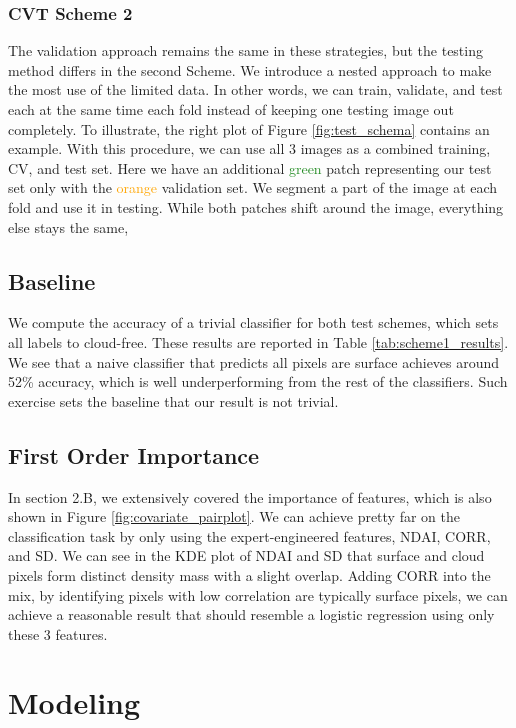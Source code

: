 \documentclass[11pt, letterpaper, journal]{IEEEtran}
\begin{document}
\subsubsection{CVT Scheme 2}
The validation approach remains the same in these strategies, but the testing method differs in the second Scheme. We introduce a nested approach to make the most use of the limited data. In other words, we can train, validate, and test each at the same time each fold instead of keeping one testing image out completely. To illustrate, the right plot of Figure \ref{fig:test_schema} contains an example. With this procedure, we can use all 3 images as a combined training, CV, and test set. Here we have an additional \textcolor{ForestGreen}{green} patch representing our test set only with the \textcolor{orange}{orange} validation set. We segment a part of the image at each fold and use it in testing. While both patches shift around the image, everything else stays the same, 

\subsection{Baseline}
We compute the accuracy of a trivial classifier for both test schemes, which sets all labels to cloud-free. These results are reported in Table \ref{tab:scheme1_results}. We see that a naive classifier that predicts all pixels are surface achieves around 52\% accuracy, which is well underperforming from the rest of the classifiers. Such exercise sets the baseline that our result is not trivial.

\subsection{First Order Importance}
In section 2.B, we extensively covered the importance of features, which is also shown in Figure \ref{fig:covariate_pairplot}. We can achieve pretty far on the classification task by only using the expert-engineered features, NDAI, CORR, and SD. We can see in the KDE plot of NDAI and SD that surface and cloud pixels form distinct density mass with a slight overlap. Adding CORR into the mix, by identifying pixels with low correlation are typically surface pixels, we can achieve a reasonable result that should resemble a logistic regression using only these 3 features.


\section{Modeling}
\end{document}
